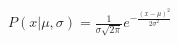 \documentclass[preview]{standalone}
\begin{document}
\begin{align*}
P(x|\mu,\sigma) = \frac{1}{\sigma\sqrt{2\pi}}e^{-\frac{(x-\mu)^2}{2\sigma^2}}
\end{align*}
\end{document}
